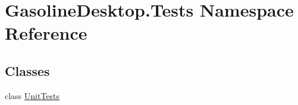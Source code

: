 \hypertarget{namespace_gasoline_desktop_1_1_tests}{}\section{Gasoline\+Desktop.\+Tests Namespace Reference}
\label{namespace_gasoline_desktop_1_1_tests}
\subsection*{Classes}
\begin{DoxyCompactItemize}
\item 
class \mbox{\hyperlink{class_gasoline_desktop_1_1_tests_1_1_unit_tests}{Unit\+Tests}}
\end{DoxyCompactItemize}
